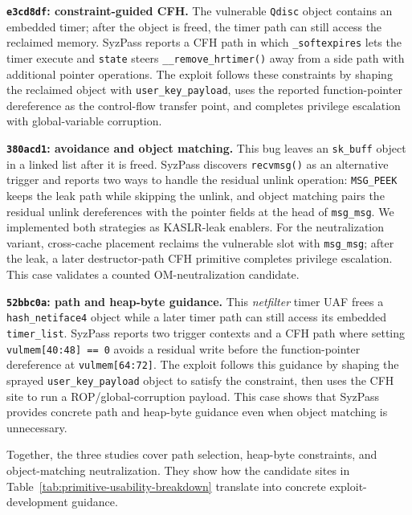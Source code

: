 \noindent\textbf{\texttt{e3cd8df}: constraint-guided CFH.}
The vulnerable \texttt{Qdisc} object contains an embedded timer; after the object is freed, the timer path can still access the reclaimed memory. SyzPass reports a CFH path in which \texttt{\_softexpires} lets the timer execute and \texttt{state} steers \texttt{\_\_remove\_hrtimer()} away from a side path with additional pointer operations. The exploit follows these constraints by shaping the reclaimed object with \texttt{user\_key\_payload}, uses the reported function-pointer dereference as the control-flow transfer point, and completes privilege escalation with global-variable corruption.

\noindent\textbf{\texttt{380acd1}: avoidance and object matching.}
This bug leaves an \texttt{sk\_buff} object in a linked list after it is freed. SyzPass discovers \texttt{recvmsg()} as an alternative trigger and reports two ways to handle the residual unlink operation: \texttt{MSG\_PEEK} keeps the leak path while skipping the unlink, and object matching pairs the residual unlink dereferences with the pointer fields at the head of \texttt{msg\_msg}. We implemented both strategies as KASLR-leak enablers. For the neutralization variant, cross-cache placement reclaims the vulnerable slot with \texttt{msg\_msg}; after the leak, a later destructor-path CFH primitive completes privilege escalation. This case validates a counted OM-neutralization candidate.

\noindent\textbf{\texttt{52bbc0a}: path and heap-byte guidance.}
This \textit{netfilter} timer UAF frees a \texttt{hash\_netiface4} object while a later timer path can still access its embedded \texttt{timer\_list}. SyzPass reports two trigger contexts and a CFH path where setting \texttt{vulmem[40:48] == 0} avoids a residual write before the function-pointer dereference at \texttt{vulmem[64:72]}. The exploit follows this guidance by shaping the sprayed \texttt{user\_key\_payload} object to satisfy the constraint, then uses the CFH site to run a ROP/global-corruption payload. This case shows that SyzPass provides concrete path and heap-byte guidance even when object matching is unnecessary.

Together, the three studies cover path selection, heap-byte constraints, and object-matching neutralization. They show how the candidate sites in Table~\ref{tab:primitive-usability-breakdown} translate into concrete exploit-development guidance.




